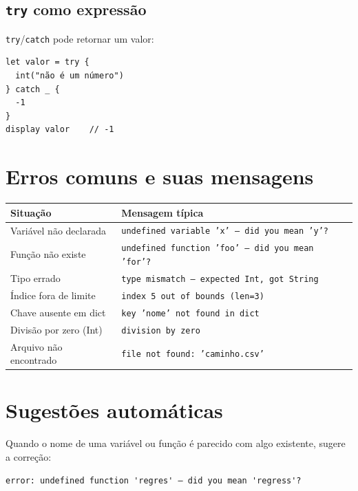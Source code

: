 \subsection*{\texttt{try} como expressão}

\lstinline{try}/\lstinline{catch} pode retornar um valor:

\begin{lstlisting}
let valor = try {
  int("não é um número")
} catch _ {
  -1
}
display valor    // -1
\end{lstlisting}

\section{Erros comuns e suas mensagens}

\begin{center}
\begin{tabular}{ll}
\toprule
\textbf{Situação} & \textbf{Mensagem típica} \\
\midrule
Variável não declarada   & \texttt{undefined variable 'x' — did you mean 'y'?} \\
Função não existe        & \texttt{undefined function 'foo' — did you mean 'for'?} \\
Tipo errado              & \texttt{type mismatch — expected Int, got String} \\
Índice fora de limite    & \texttt{index 5 out of bounds (len=3)} \\
Chave ausente em dict    & \texttt{key 'nome' not found in dict} \\
Divisão por zero (Int)   & \texttt{division by zero} \\
Arquivo não encontrado   & \texttt{file not found: 'caminho.csv'} \\
\bottomrule
\end{tabular}
\end{center}

\section{Sugestões automáticas}

Quando o nome de uma variável ou função é parecido com algo existente, \hayashi{}
sugere a correção:

\begin{lstlisting}[style=inline]
error: undefined function 'regres' — did you mean 'regress'?
\end{lstlisting}

